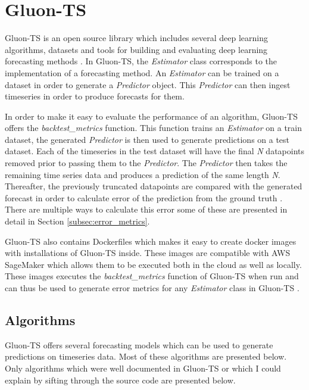 \section{Gluon-TS}
\label{subsec:gluonts_overview}
Gluon-TS is an open source library which includes several deep learning algorithms, datasets and tools for building and evaluating deep learning forecasting methods \cite{gluonts-website,gluonts_paper,gluonts-github}. In Gluon-TS, the \textit{Estimator} class corresponds to the implementation of a forecasting method. An \textit{Estimator} can be trained on a dataset in order to generate a \textit{Predictor} object. This \textit{Predictor} can then ingest timeseries in order to produce forecasts for them.

In order to make it easy to evaluate the performance of an algorithm, Gluon-TS offers the \textit{backtest\_metrics} function. This function trains an \textit{Estimator} on a train dataset, the generated \textit{Predictor} is then used to generate predictions on a test dataset. Each of the timeseries in the test dataset will have the final \textit{N} datapoints removed prior to passing them to the \textit{Predictor}. The \textit{Predictor} then takes the remaining time series data and produces a prediction of the same length \textit{N}. Thereafter, the previously truncated datapoints are compared with the generated forecast in order to calculate error of the prediction from the ground truth \cite{gluonts-github}. There are multiple ways to calculate this error some of these are presented in detail in Section \ref{subsec:error_metrics}.

Gluon-TS also contains Dockerfiles which makes it easy to create docker images with installations of Gluon-TS inside. These images are compatible with AWS SageMaker which allows them to be executed both in the cloud as well as locally. These images executes the \textit{backtest\_metrics} function of Gluon-TS when run and can thus be used to generate error metrics for any \textit{Estimator} class in Gluon-TS \cite{gluonts-github}.

\subsection{Algorithms}
\label{algorithms}
Gluon-TS offers several forecasting models which can be used to generate predictions on timeseries data. Most of these algorithms are presented below. Only algorithms which were well documented in Gluon-TS or which I could explain by sifting through the source code are presented below.

